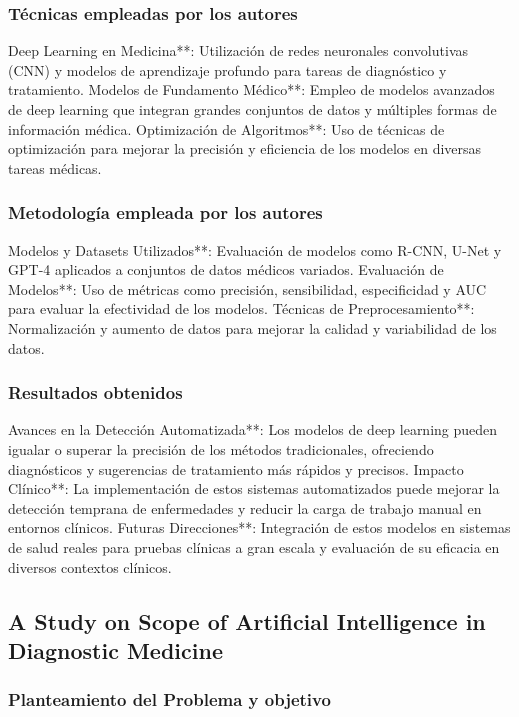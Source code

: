 \subsubsection{Técnicas empleadas por los autores}

Deep Learning en Medicina**: Utilización de redes neuronales convolutivas (CNN) y modelos de aprendizaje profundo para tareas de diagnóstico y tratamiento.
Modelos de Fundamento Médico**: Empleo de modelos avanzados de deep learning que integran grandes conjuntos de datos y múltiples formas de información médica.
Optimización de Algoritmos**: Uso de técnicas de optimización para mejorar la precisión y eficiencia de los modelos en diversas tareas médicas.

\subsubsection{Metodología empleada por los autores}

Modelos y Datasets Utilizados**: Evaluación de modelos como R-CNN, U-Net y GPT-4 aplicados a conjuntos de datos médicos variados.
Evaluación de Modelos**: Uso de métricas como precisión, sensibilidad, especificidad y AUC para evaluar la efectividad de los modelos.
Técnicas de Preprocesamiento**: Normalización y aumento de datos para mejorar la calidad y variabilidad de los datos.

\subsubsection{Resultados obtenidos}

Avances en la Detección Automatizada**: Los modelos de deep learning pueden igualar o superar la precisión de los métodos tradicionales, ofreciendo diagnósticos y sugerencias de tratamiento más rápidos y precisos.
Impacto Clínico**: La implementación de estos sistemas automatizados puede mejorar la detección temprana de enfermedades y reducir la carga de trabajo manual en entornos clínicos.
Futuras Direcciones**: Integración de estos modelos en sistemas de salud reales para pruebas clínicas a gran escala y evaluación de su eficacia en diversos contextos clínicos.

\subsection{A Study on Scope of Artificial Intelligence in Diagnostic Medicine}

\subsubsection{Planteamiento del Problema y objetivo}


